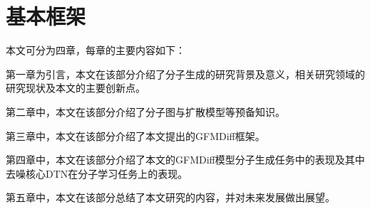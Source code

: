 \section{基本框架}
本文可分为四章，每章的主要内容如下：

第一章为引言，本文在该部分介绍了分子生成的研究背景及意义，相关研究领域的研究现状及本文的主要创新点。

第二章中，本文在该部分介绍了分子图与扩散模型等预备知识。

第三章中，本文在该部分介绍了本文提出的GFMDiff框架。

第四章中，本文在该部分介绍了本文的GFMDiff模型分子生成任务中的表现及其中去噪核心DTN在分子学习任务上的表现。

第五章中，本文在该部分总结了本文研究的内容，并对未来发展做出展望。